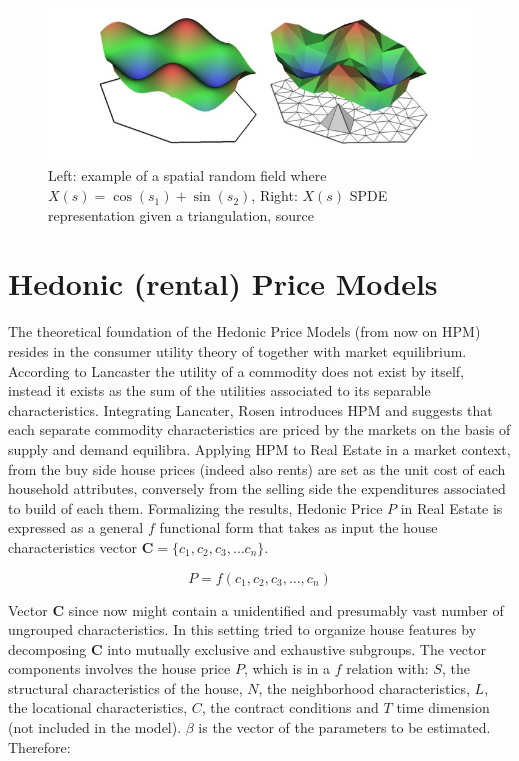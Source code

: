 \documentclass[
  12pt,
  a4paper,
  oneside]{book}
\theoremstyle{definition}
\theoremstyle{definition}
\theoremstyle{definition}
\theoremstyle{remark}
\begin{document}
\begin{figure}
\centering
\includegraphics{images/spde_indexedsurface.jpg}
\caption{\label{fig:spdesurf}Left: example of a spatial random field where \(X(s)= \cos(s_1)+\sin(s_2)\), Right: \(X(s)\) SPDE representation given a triangulation, \citet{Cameletti2012} source}
\end{figure}

\hypertarget{hedonic-rental-price-models}{%
\section{Hedonic (rental) Price Models}\label{hedonic-rental-price-models}}

The theoretical foundation of the Hedonic Price Models (from now on HPM) resides in the consumer utility theory of \citet{Lancaster} together with \citet{Rosen} market equilibrium. According to Lancaster the utility of a commodity does not exist by itself, instead it exists as the sum of the utilities associated to its separable characteristics. Integrating Lancater, Rosen introduces HPM and suggests that each separate commodity characteristics are priced by the markets on the basis of supply and demand equilibra. Applying HPM to Real Estate in a market context, from the buy side house prices (indeed also rents) are set as the unit cost of each household attributes, conversely from the selling side the expenditures associated to build of each them.
Formalizing the results, Hedonic Price \(P\) in Real Estate is expressed as a general \(f\) functional form that takes as input the house characteristics vector \(\mathbf{C} = \{c_1,c_2, c_3, \ldots c_n\}\).

\[P=f\left(c_{1}, c_{2}, c_{3}, \ldots, c_{n}\right)\]

Vector \(\mathbf{C}\) since now might contain a unidentified and presumably vast number of ungrouped characteristics. In this setting \citet{Malpezzi} tried to organize house features by decomposing \(\mathbf{C}\) into mutually exclusive and exhaustive subgroups. The vector components involves the house price \(P\), which is in a \(f\) relation with: \(S\), the structural characteristics of the house, \(N\), the neighborhood characteristics, \(L\), the locational characteristics, \(C\), the contract conditions and \(T\) time dimension (not included in the model). \(\beta\) is the vector of the parameters to be estimated. Therefore:
\end{document}
